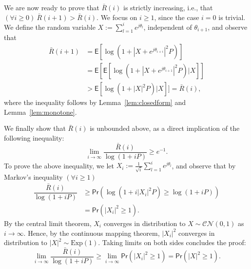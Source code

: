 \documentclass[10pt,journal,a4paper]{IEEEtran}
\newcommand{\eqdef}{:=}
\newcommand{\E}{\mathsf{E}}		%
\renewcommand{\P}{\mathsf{Pr}} 			%
\newcommand{\CN}{\mathcal{CN}}			%
\begin{document}
We are now ready to prove that $\bar{R}(i)$ is strictly increasing, i.e., that
$(\forall i \geq 0)~\bar{R}(i+1) > \bar{R}(i)$. We focus on $i\geq 1$, since the case $i=0$ is trivial. We define the random variable $X  \eqdef \sum_{l=1}^ie^{j\theta_l}$, independent of $\theta_{i+1}$, and observe that
\begin{align*}
\bar{R}(i+1) &=\E[\log(1+|X+e^{j\theta_{i+i}}|^2P)] \\
&= \E[\E[\log(1+|X+e^{j\theta_{i+1}}|^2P)|X]] \\
& > \E[\log(1+|X|^2P)|X]] = \bar{R}(i),
\end{align*}
where the inequality follows by Lemma~\ref{lem:closedform} and Lemma~\ref{lem:monotone}.

We finally show that $\bar{R}(i)$ is unbounded above, as a direct implication of the following inequality:
\begin{equation*}
\lim_{i\to \infty}\dfrac{\bar{R}(i)}{\log(1+iP)} \geq e^{-1}.
\end{equation*}
To prove the above inequality, we let $X_i \eqdef \frac{1}{\sqrt{i}}\sum_{l=1}^ie^{j\theta_l}$, and observe that by Markov's inequality  $(\forall i \geq 1)$
\begin{align*}
\dfrac{\bar{R}(i)}{\log(1+iP)} &\geq \P\left(\log(1+i|X_i|^2P)\geq \log(1+iP)\right) \\
&= \P(|X_i|^2\geq 1).
\end{align*}
By the central limit theorem, $X_i$ converges in distribution to $X\sim \CN(0,1)$ as $i\to \infty$. Hence, by the continuous mapping theorem, $|X_i|^2$ converges in distribution to $|X|^2\sim \text{Exp}(1)$. Taking limits on both sides concludes the proof: 
\begin{equation*}
\lim_{i\to\infty}\dfrac{\bar{R}(i)}{\log(1+iP)} \geq \lim_{i\to\infty}\P(|X_i|^2\geq 1) = \P(|X|^2\geq 1).
\end{equation*}
\end{document}
